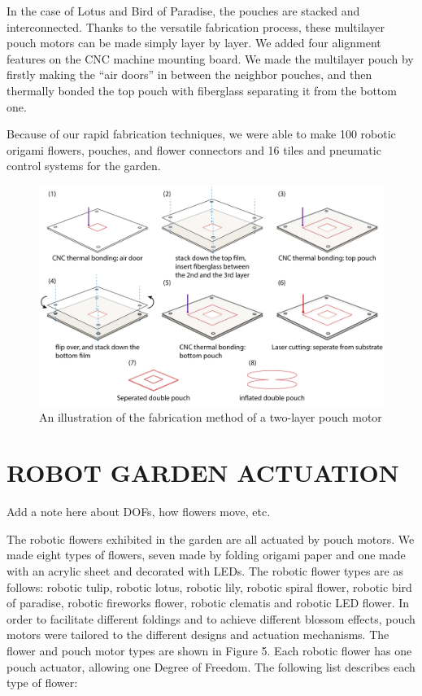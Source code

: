 \documentclass[letterpaper, 10 pt, conference]{ieeeconf}  %
\begin{document}
In the case of Lotus and Bird of Paradise, the pouches are stacked and interconnected. Thanks to the versatile fabrication process, these multilayer pouch motors can be made simply layer by layer. We added four alignment features on the CNC machine mounting board. We made the multilayer pouch by firstly making the ``air doors'' in between the neighbor pouches, and then thermally bonded the top pouch with fiberglass separating it from the bottom one.

Because of our rapid fabrication techniques, we were able to make 100 robotic origami flowers, pouches, and flower connectors and 16 tiles and pneumatic control systems for the garden. 

\begin{figure}[thpb]
	\centering
	\includegraphics[scale=.25]{doublepouch.png}
	\caption{An illustration of the fabrication method of a two-layer pouch motor}
	\label{doublepouch}
\end{figure}


\section{ROBOT GARDEN ACTUATION}

Add a note here about DOFs, how flowers move, etc.

The robotic flowers exhibited in the garden are all actuated by pouch motors. We made eight types of flowers, seven made by folding origami paper and one made with an acrylic sheet and decorated with LEDs. The robotic flower types are as follows: robotic tulip, robotic lotus, robotic lily, robotic spiral flower, robotic bird of paradise, robotic fireworks flower, robotic clematis and robotic LED flower. In order to facilitate different foldings and to achieve different blossom effects, pouch motors were tailored to the different designs and actuation mechanisms.  The flower and pouch motor types are shown in Figure 5.  Each robotic flower has one pouch actuator, allowing one Degree of Freedom.  The following list describes each type of flower:
\end{document}
